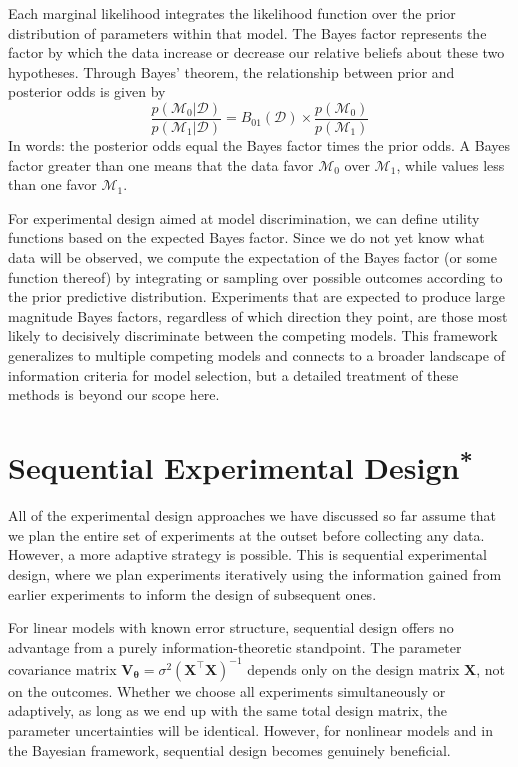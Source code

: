Each marginal likelihood integrates the likelihood function over the prior distribution of parameters within that model. The Bayes factor represents the factor by which the data increase or decrease our relative beliefs about these two hypotheses. Through Bayes' theorem, the relationship between prior and posterior odds is given by
\begin{equation}
    \frac{p(\mathcal{M}_0|\mathcal{D})}{p(\mathcal{M}_1|\mathcal{D})} = B_{01}(\mathcal{D}) \times \frac{p(\mathcal{M}_0)}{p(\mathcal{M}_1)}
\end{equation}
In words: the posterior odds equal the Bayes factor times the prior odds. A Bayes factor greater than one means that the data favor $\mathcal{M}_0$ over $\mathcal{M}_1$, while values less than one favor $\mathcal{M}_1$.

For experimental design aimed at model discrimination, we can define utility functions based on the expected Bayes factor. Since we do not yet know what data will be observed, we compute the expectation of the Bayes factor (or some function thereof) by integrating or sampling over possible outcomes according to the prior predictive distribution. Experiments that are expected to produce large magnitude Bayes factors, regardless of which direction they point, are those most likely to decisively discriminate between the competing models. This framework generalizes to multiple competing models and connects to a broader landscape of information criteria for model selection, but a detailed treatment of these methods is beyond our scope here.

\section{\texorpdfstring{Sequential Experimental Design\textsuperscript{*}}{Sequential Experimental Design}}

All of the experimental design approaches we have discussed so far assume that we plan the entire set of experiments at the outset before collecting any data. However, a more adaptive strategy is possible. This is sequential experimental design, where we plan experiments iteratively using the information gained from earlier experiments to inform the design of subsequent ones.

For linear models with known error structure, sequential design offers no advantage from a purely information-theoretic standpoint. The parameter covariance matrix $\mathbf{V}_{\boldsymbol{\theta}} = \sigma^2 (\mathbf{X}^\top \mathbf{X})^{-1}$ depends only on the design matrix $\mathbf{X}$, not on the outcomes. Whether we choose all experiments simultaneously or adaptively, as long as we end up with the same total design matrix, the parameter uncertainties will be identical. However, for nonlinear models and in the Bayesian framework, sequential design becomes genuinely beneficial.

